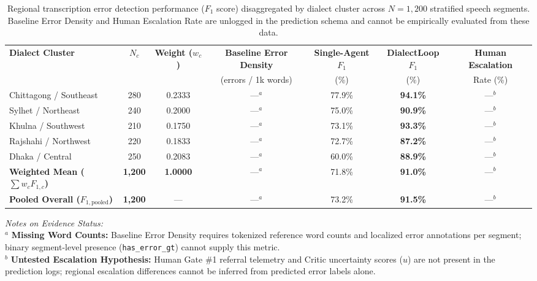 
\begin{table}[t]
\centering
\small
\caption{Regional transcription error detection performance ($F_1$ score) disaggregated by dialect cluster across $N=1{,}200$ stratified speech segments. Baseline Error Density and Human Escalation Rate are unlogged in the prediction schema and cannot be empirically evaluated from these data.}
\label{tab:regional_performance}
\begin{tabular}{lcccccc}
\toprule
\textbf{Dialect Cluster} & \textbf{$N_c$} & \textbf{Weight ($w_c$)} & \textbf{Baseline Error Density} & \textbf{Single-Agent $F_1$} & \textbf{DialectLoop $F_1$} & \textbf{Human Escalation} \\
& & & (errors / 1k words) & (\%) & (\%) & Rate (\%) \\
\midrule
Chittagong / Southeast & 280 & 0.2333 & ---$^a$ & 77.9\% & \textbf{94.1\%} & ---$^b$ \\
Sylhet / Northeast     & 240 & 0.2000 & ---$^a$ & 75.0\% & \textbf{90.9\%} & ---$^b$ \\
Khulna / Southwest     & 210 & 0.1750 & ---$^a$ & 73.1\% & \textbf{93.3\%} & ---$^b$ \\
Rajshahi / Northwest   & 220 & 0.1833 & ---$^a$ & 72.7\% & \textbf{87.2\%} & ---$^b$ \\
Dhaka / Central        & 250 & 0.2083 & ---$^a$ & 60.0\% & \textbf{88.9\%} & ---$^b$ \\
\midrule
\textbf{Weighted Mean ($\sum w_c F_{1,c}$)} & \textbf{1,200} & \textbf{1.0000} & ---$^a$ & 71.8\% & \textbf{91.0\%} & ---$^b$ \\
\textbf{Pooled Overall ($F_{1,\mathrm{pooled}}$)} & \textbf{1,200} & --- & ---$^a$ & 73.2\% & \textbf{91.5\%} & ---$^b$ \\
\bottomrule
\end{tabular}
\vspace{1ex}
\parbox{\linewidth}{\footnotesize
\textit{Notes on Evidence Status:} \\
$^a$ \textbf{Missing Word Counts:} Baseline Error Density requires tokenized reference word counts and localized error annotations per segment; binary segment-level presence (\texttt{has\_error\_gt}) cannot supply this metric. \\
$^b$ \textbf{Untested Escalation Hypothesis:} Human Gate \#1 referral telemetry and Critic uncertainty scores ($u$) are not present in the prediction logs; regional escalation differences cannot be inferred from predicted error labels alone.
}
\end{table}
